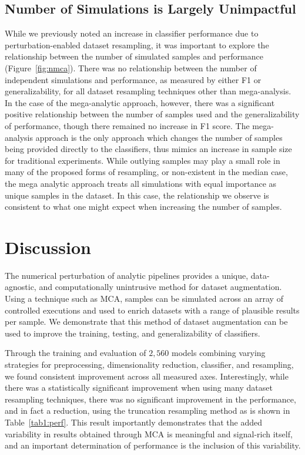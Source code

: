 \documentclass[10pt]{SelfArx} %
\begin{document}
\subsection*{Number of Simulations is Largely Unimpactful}

While we previously noted an increase in classifier performance due to perturbation-enabled dataset resampling, it was
important to explore the relationship between the number of simulated samples and performance (Figure~\ref{fig:nmca}).
There was no relationship between the number of independent simulations and performance, as measured by either F1 or
generalizability, for all dataset resampling techniques other than mega-analysis. In the case of the mega-analytic
approach, however, there was a significant positive relationship between the number of samples used and the
generalizability of performance, though there remained no increase in F1 score. The mega-analysis approach is the only
approach which changes the number of samples being provided directly to the classifiers, thus mimics an increase in
sample size for traditional experiments. While outlying samples may play a small role in many of the proposed forms of
resampling, or non-existent in the median case, the mega analytic approach treats all simulations with equal importance
as unique samples in the dataset. In this case, the relationship we observe is consistent to what one might expect when
increasing the number of samples.

\section*{Discussion}

The numerical perturbation of analytic pipelines provides a unique, data-agnostic, and computationally unintrusive
method for dataset augmentation. Using a technique such as MCA, samples can be simulated across an array of controlled
executions and used to enrich datasets with a range of plausible results per sample. We demonstrate that this method of
dataset augmentation can be used to improve the training, testing, and generalizability of classifiers.

Through the training and evaluation of $2,560$ models combining varying strategies for preprocessing, dimensionality
reduction, classifier, and resampling, we found consistent improvement across all measured axes. Interestingly, while
there was a statistically significant improvement when using many dataset resampling techniques, there was no
significant improvement in the performance, and in fact a reduction, using the truncation resampling method as is shown
in Table~\ref{tab1:perf}. This result importantly demonstrates that the added variability in results obtained through
MCA is meaningful and signal-rich itself, and an important determination of performance is the inclusion of this
variability.
\end{document}
